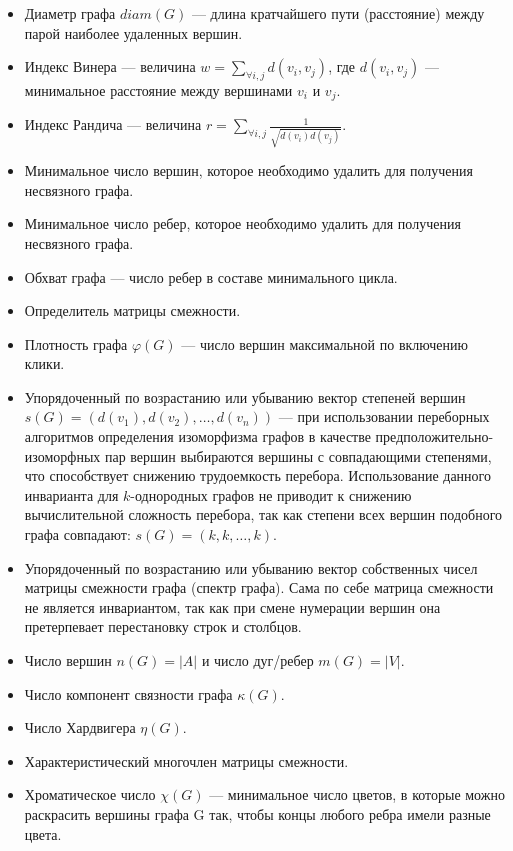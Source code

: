 \begin{itemize}
\item Диаметр графа  $diam(G)$ --- длина кратчайшего пути (расстояние) между парой наиболее удаленных вершин.
\item Индекс Винера — величина  $w=\sum _{{\forall i,j}}d(v_{i},v_{j})$, где  $d(v_{i},v_{j})$ — минимальное расстояние между вершинами  $v_{i}$ и  $v_{j}$.
\item Индекс Рандича — величина  $r=\sum _{{\forall i,j}}{\frac  {1}{{\sqrt  {d(v_{i})d(v_{j})}}}}$.
\item Минимальное число вершин, которое необходимо удалить для получения несвязного графа.
\item Минимальное число ребер, которое необходимо удалить для получения несвязного графа.
\item Обхват графа — число ребер в составе минимального цикла.
\item Определитель матрицы смежности.
\item Плотность графа  $\varphi (G)$ --- число вершин максимальной по включению клики.
\item Упорядоченный по возрастанию или убыванию вектор степеней вершин  $s(G)=(d(v_{1}),d(v_{2}),\dots ,d(v_{n}))$ --- при
использовании переборных алгоритмов определения изоморфизма графов в качестве
предположительно-изоморфных пар вершин выбираются вершины с совпадающими степенями,
что способствует снижению трудоемкость перебора. Использование данного инварианта для
$k$-однородных графов не приводит к снижению вычислительной сложность перебора, так как
степени всех вершин подобного графа совпадают:  $s(G)=(k,k,\dots ,k)$.
\item Упорядоченный по возрастанию или убыванию вектор собственных чисел матрицы смежности графа (спектр графа). Сама по себе матрица смежности не является инвариантом, так как при смене нумерации вершин она претерпевает перестановку строк и столбцов.
\item Число вершин  $n(G)=|A|$ и число дуг/ребер  $m(G)=|V|$.
\item Число компонент связности графа  $\kappa (G)$.
\item Число Хардвигера  $\eta (G)$.
\item Характеристический многочлен матрицы смежности.
\item Хроматическое число  $\chi (G)$ --- минимальное число цветов, в которые можно
раскрасить вершины графа G так, чтобы концы любого ребра имели разные цвета.
\end{itemize}
